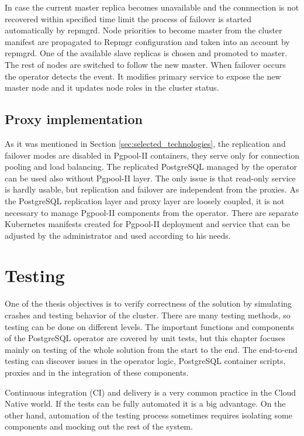 \documentclass[
  digital, %
  twoside, %
  table,   %
  lof,     %
  lot,     %
]{fithesis3}
\begin{document}
In case the current master replica becomes unavailable and the connnection is not recovered within specified time limit the process of failover is started automatically by repmgrd. Node priorities to become master from the cluster manifest are propagated to Repmgr configuration and taken into an account by repmgrd. One of the available slave replicas is chosen and promoted to master. The rest of nodes are switched to follow the new master. When failover occurs the operator detects the event. It modifies primary service to expose the new master node and it updates node roles in the cluster status.

\section{Proxy implementation}
As it was mentioned in Section \ref{sec:selected_technologies}, the replication and failover modes are disabled in Pgpool-II containers, they serve only for connection pooling and load balancing. The replicated PostgreSQL managed by the operator can be used also without Pgpool-II layer. The only issue is that read-only service is hardly usable, but replication and failover are independent from the proxies. As the PostgreSQL replication layer and proxy layer are loosely coupled, it is not necessary to manage Pgpool-II components from the operator. There are separate Kubernetes manifests created for Pgpool-II deployment and service that can be adjusted by the administrator and used according to his needs.

\chapter{Testing} \label{chap:testing}
One of the thesis objectives is to verify correctness of the solution by simulating crashes and testing behavior of the cluster. There are many testing methods, so testing can be done on different levels. The important functions and components of the PostgreSQL operator are covered by unit tests, but this chapter focuses mainly on testing of the whole solution from the start to the end. The end-to-end testing can discover issues in the operator logic, PostgreSQL container scripts, proxies and in the integration of these components.

Continuous integration (CI) and delivery is a very common practice in the Cloud Native world. If the tests can be fully automated it is a big advantage. On the other hand, automation of the testing process sometimes requires isolating some components and mocking out the rest of the system.
\end{document}
